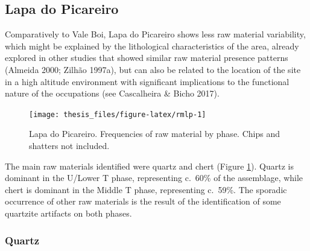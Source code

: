 \documentclass[12pt,twoside]{reedthesis}
\begin{document}
\hypertarget{lapa-do-picareiro-3}{%
\subsection{Lapa do Picareiro}\label{lapa-do-picareiro-3}}

Comparatively to Vale Boi, Lapa do Picareiro shows less raw material variability, which might be explained by the lithological characteristics of the area, already explored in other studies that showed similar raw material presence patterns (Almeida 2000; Zilhão 1997a), but can also be related to the location of the site in a high altitude environment with significant implications to the functional nature of the occupations (see Cascalheira \& Bicho 2017).
\begin{figure}[H]

{\centering \texttt{[image: thesis\_files/figure-latex/rmlp-1]} 

}

\caption{Lapa do Picareiro. Frequencies of raw material by phase. Chips and shatters not included.}\label{fig:rmlp}
\end{figure}
The main raw materials identified were quartz and chert (Figure \ref{fig:rmlp}). Quartz is dominant in the U/Lower T phase, representing c.~60\% of the assemblage, while chert is dominant in the Middle T phase, representing c.~59\%. The sporadic occurrence of other raw materials is the result of the identification of some quartzite artifacts on both phases.

\hypertarget{quartz-1}{%
\subsubsection{Quartz}\label{quartz-1}}
\end{document}
